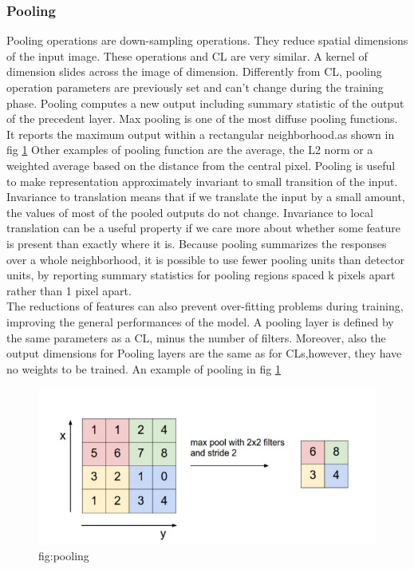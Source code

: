 \documentclass[a4paper, 10pt]{book}
\begin{document}
\subsubsection{Pooling}
Pooling operations are down-sampling operations. They reduce spatial dimensions of the input image.
These operations and CL are very similar. A kernel of dimension slides across the image of dimension.
Differently from CL, pooling operation parameters are previously set and can’t change during the training phase.
Pooling computes a new output including summary statistic of the output of the precedent layer.
Max pooling is one of the most diffuse pooling functions. It reports the maximum output within a rectangular neighborhood.as shown in fig \ref{fig:pooling}
Other examples of pooling function are the average, the L2 norm or a weighted average based on the distance from the central pixel.
Pooling is useful to make representation approximately invariant to small transition of the input.
Invariance to translation means that if we translate the input by a small amount, the values of most of the pooled outputs do not change.
Invariance to local translation can be a useful property if we care more about whether some feature is present than exactly where it is.
Because pooling summarizes the responses over a whole neighborhood, it is
possible to use fewer pooling units than detector units, by reporting summary
statistics for pooling regions spaced k pixels apart rather than 1 pixel apart.
\\
The reductions of features can also prevent over-fitting problems during training, improving the general performances of the model.
A pooling layer is defined by the same parameters as a CL, minus the number of filters. 
Moreover, also the output dimensions for Pooling layers are the same as for CLs,however, they have no weights to be trained.
An example of pooling in fig \ref{fig:pooling}
\begin{figure}[htp]
    \centering
    \includegraphics[width=15cm]{pooling.png}
    \caption{fig:pooling}
    \label{fig:pooling}
\end{figure}
\end{document}
